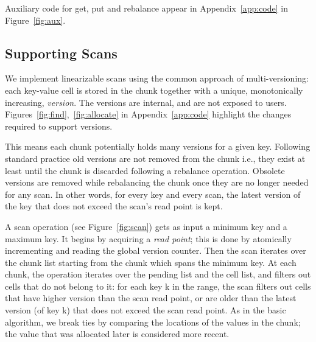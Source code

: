 Auxiliary code for get, put and rebalance appear in Appendix~\ref{app:code} in Figure~\ref{fig:aux}.%



\subsection{Supporting Scans}
\label{sec:algo:scan}

We implement linearizable scans using the common approach of multi-versioning: each key-value cell is stored in the chunk together with a unique, monotonically increasing, \emph{version}. The versions are internal, and are not exposed to {\kiwi} users. 
Figures~\ref{fig:find},~\ref{fig:allocate} in Appendix~\ref{app:code} highlight the changes required to support versions.

This means each chunk potentially holds many versions for a given key. Following standard practice old versions are not removed from the chunk i.e., they exist at least until the chunk is discarded following a rebalance operation. Obsolete versions are removed while rebalancing the chunk once they are no longer needed for any scan. In other words, for every key and every scan, the latest version of the key that does not exceed the scan's read point is kept.

A scan operation (see Figure~\ref{fig:scan}) gets as input a minimum key and a maximum key. It begins by acquiring a \emph{read point}; this is done by atomically incrementing and reading the global version counter. Then the scan iterates over the chunk list starting from the chunk which spans the minimum key. At each chunk, the operation iterates over the pending list and the cell list, and filters out cells that do not belong to it: for each key k in the range, the scan filters out cells that have higher version than the scan read point, or are older than the latest version (of key k) that does not exceed the scan read point. As in the basic algorithm, we break ties by comparing the locations of the values in the chunk; the value that was allocated later is considered more recent.

